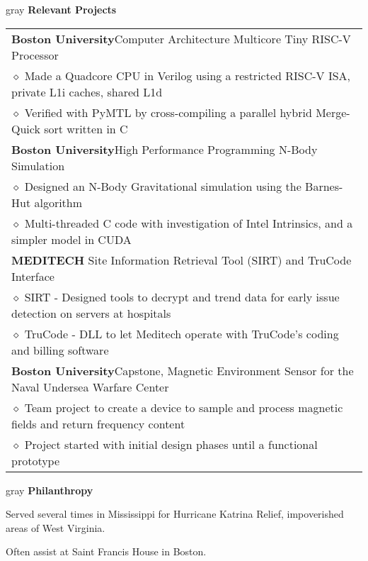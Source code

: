 \documentclass[10.5pt,letterpaper]{article}
\newcommand{\org}[1]{\textbf{#1}}
\newcommand{\pseudoitem}{\diamond}
\newcommand{\vertspace}{\vspace{1.2mm}}
\newcommand{\minorindent}{\hspace{4.5mm}}
\newcommand{\minoritem}{\minorindent $\pseudoitem$ }
\newcommand{\tablewidth}{.9\linewidth}
\newcommand{\undergrad}{Boston University}
\newcommand{\grad}{Boston University}
\begin{document}
	\vertspace
	\noindent
	\begin{heading}{gray}
		\textbf{Relevant Projects}
	\end{heading}
	\begin{tabular*}{\tablewidth}{@{\extracolsep{\fill}}l}
		\org{\grad}\space Computer Architecture Multicore Tiny RISC-V Processor\\
		\minoritem Made a Quadcore CPU in Verilog using a restricted RISC-V ISA, private L1i caches, shared L1d\\
		\minoritem Verified with PyMTL by cross-compiling a parallel hybrid Merge-Quick sort written in C\\
		\org{\grad}\space High Performance Programming N-Body Simulation\\
		\minoritem Designed an N-Body Gravitational simulation using the Barnes-Hut algorithm\\
		\minoritem Multi-threaded C code with investigation of Intel Intrinsics, and a simpler model in CUDA\\
		\org{MEDITECH} Site Information Retrieval Tool (SIRT) and TruCode Interface\\
		\minoritem SIRT - Designed tools to decrypt and trend data for early issue detection on servers at hospitals\\
		\minoritem TruCode - DLL to let Meditech operate with TruCode's coding and billing software\\
		\org{\undergrad}\space Capstone, Magnetic Environment Sensor for the Naval Undersea Warfare Center\\
		\minoritem Team project to create a device to sample and process magnetic fields and return frequency content\\
		\minoritem Project started with initial design phases until a functional prototype\\
	\end{tabular*}
	

	
	\vertspace
	\noindent
	\begin{heading}{gray}
		\textbf{Philanthropy}
	\end{heading}
	Served several times in Mississippi for Hurricane Katrina Relief, impoverished areas of West Virginia.
	
	Often assist at Saint Francis House in Boston.
\end{document}
